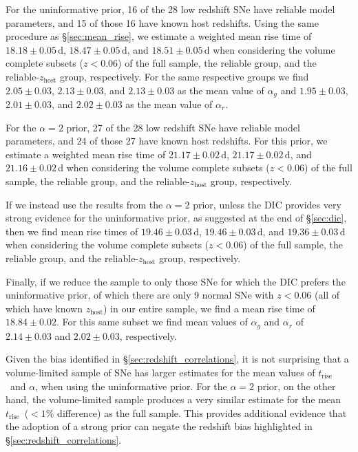 \documentclass[twocolumn]{./aastex63}
\newcommand{\trise}{$t_\mathrm{rise}$}
\begin{document}
For the uninformative prior, 16 of the 28 low redshift SNe have reliable model
parameters, and 15 of those 16 have known host redshifts. Using the same
procedure as \S\ref{sec:mean_rise}, we estimate a weighted mean rise time of
$18.18 \pm 0.05$\,d, $18.47 \pm 0.05$\,d, and $18.51 \pm 0.05$\,d when
considering the volume complete subsets ($z < 0.06$) of the full sample, the
reliable group, and the reliable-$z_\mathrm{host}$ group, respectively. For
the same respective groups we find $2.05 \pm 0.03$, $2.13 \pm 0.03$, and $2.13
\pm 0.03$ as the mean value of $\alpha_g$ and $1.95 \pm 0.03$, $2.01 \pm
0.03$, and $2.02 \pm 0.03$ as the mean value of $\alpha_r$.

For the $\alpha = 2$ prior, 27 of the 28 low redshift SNe have reliable model
parameters, and 24 of those 27 have known host redshifts. For this prior, we
estimate a weighted mean rise time of $21.17 \pm 0.02$\,d, $21.17 \pm 0.02$\,d,
and $21.16 \pm 0.02$\,d when considering the volume complete subsets ($z <
0.06$) of the full sample, the reliable group, and the
reliable-$z_\mathrm{host}$ group, respectively.

If we instead use the results from the $\alpha = 2$ prior, unless the DIC
provides very strong evidence for the uninformative prior, as suggested at the
end of \S\ref{sec:dic}, then we find mean rise times of $19.46 \pm 0.03$\,d,
$19.46 \pm 0.03$\,d, and $19.36 \pm 0.03$\,d when considering the volume
complete subsets ($z < 0.06$) of the full sample, the reliable group, and the
reliable-$z_\mathrm{host}$ group, respectively.

Finally, if we reduce the sample to only those SNe for which the DIC prefers the
uninformative prior, of which there are only 9 normal SNe with $z < 0.06$ (all
of which have known $z_\mathrm{host}$) in our entire sample, we find a mean rise
time of $18.84 \pm 0.02$. For this same subset we find mean values of $\alpha_g$
and $\alpha_r$ of $2.14 \pm 0.03$ and $2.02 \pm 0.03$, respectively.

Given the bias identified in \S\ref{sec:redshift_correlations}, it is not
surprising that a volume-limited sample of SNe has larger estimates for the mean
values of \trise\ and $\alpha$, when using the uninformative prior. For the
$\alpha = 2$ prior, on the other hand, the volume-limited sample produces a very
similar estimate for the mean \trise\ ($< 1\%$ difference) as the full sample.
This provides additional evidence that the adoption of a strong prior can negate
the redshift bias highlighted in \S\ref{sec:redshift_correlations}.
\end{document}
